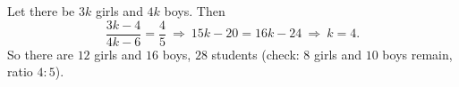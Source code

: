 Let there be $3k$ girls and $4k$ boys. Then
\[\dfrac{3k-4}{4k-6}=\dfrac{4}{5}\ \Longrightarrow\ 15k-20=16k-24\ \Longrightarrow\ k=4.\]
So there are $12$ girls and $16$ boys, $\boxed{28}$ students (check: $8$ girls and $10$ boys remain, ratio $4:5$).
